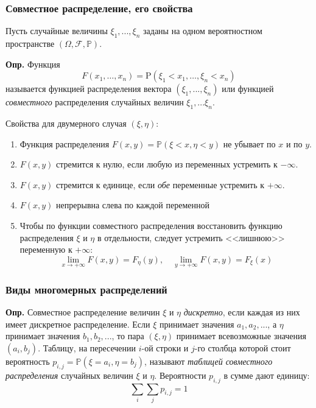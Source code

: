 \documentclass[oneside,final,14pt]{extreport}
\newcommand\mydef{{\bf Опр.}}
\newcommand\myprob[1]{{\mathbb{P}(#1)}}
\theoremstyle{definition}
\begin{document}
\subsubsection{Совместное распределение, его свойства}

Пусть случайные величины $\xi_1, ..., \xi_n$ заданы на одном вероятностном пространстве $(\Omega, \mathcal{F}, \mathbb{P})$.

\mydef{} Функция $$F\left(x_{1}, \ldots, x_{n}\right)=\mathrm{P}\left(\xi_{1}<x_{1}, \ldots, \xi_{n}<x_{n}\right)$$
называется функцией распределения вектора $(\xi_1, ..., \xi_n)$ или функцией {\it совместного} распределения случайных величин $\xi_1, ... \xi_n$.

Свойства для двумерного случая $(\xi, \eta)$:

\begin{enumerate}
    \item Функция распределения $F(x,y) = \myprob{\xi < x, \eta < y}$ не убывает по $x$ и по $y$.
    \item $F(x,y)$ стремится к нулю, если любую из переменных устремить к $-\infty$.
    \item $F(x,y)$ стремится к единице, если {\it обе} переменные устремить к $+\infty$.
    \item $F(x,y)$ непрерывна слева по каждой переменной
    \item Чтобы по функции совместного распределения восстановить функцию распределения $\xi$ и $\eta$ в отдельности, следует устремить <<лишнюю>> переменную к $+\infty$:
    $$\lim _{x \rightarrow+\infty} F(x, y)=F_{\eta}(y), \quad \lim _{y \rightarrow+\infty} F(x, y)=F_{\xi}(x)$$
\end{enumerate}

\subsubsection{Виды многомерных распределений}

\mydef{} Совместное распределение величин $\xi$ и $\eta$ {\it дискретно}, если каждая из них имеет дискретное распределение. Если $\xi$ принимает значения $a_1, a_2, ...$, а $\eta$ принимает значения $b_1, b_2, ...$, то пара $(\xi, \eta)$ принимает всевозможные значения $(a_i, b_j)$. Таблицу, на пересечении $i$-ой строки и $j$-го столбца которой стоит вероятность $p_{i,j} = \myprob{\xi = a_i, \eta = b_j}$, называют {\it таблицей совместного распределения} случайных величин $\xi$ и $\eta$. Вероятности $p_{i,j}$ в сумме дают единицу:
$$\sum_{i} \sum_{j} p_{i, j}=1$$
\end{document}
